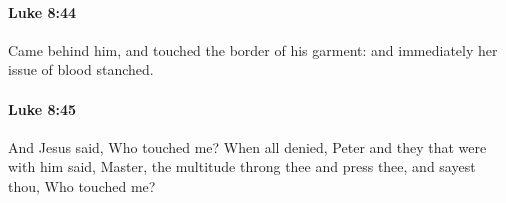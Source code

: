 		\paragraph{Luke 8:44} %
			\label{LUKE-8-44}

			Came behind him, and touched the border of his garment: and immediately her issue of blood stanched.

			\begin{framed}
			\scriptsize
				\begin{compactdesc}
					\item[SBLG] 
				\end{compactdesc}
			\end{framed}

		\paragraph{Luke 8:45} %
			\label{LUKE-8-45}

			And Jesus said, Who touched me? When all denied, Peter and they that were with him said, Master, the multitude throng thee and press thee, and sayest thou, Who touched me?

